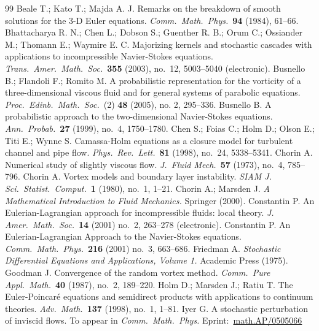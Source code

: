 \documentclass[final]{amsart}%
\numberwithin{equation}{section}
\theoremstyle{definition}
\theoremstyle{remark}
\begin{document}
\begin{thebibliography}{99}%
 Beale T.; Kato T.; Majda A. J. Remarks on the breakdown of smooth solutions for the $3$-D Euler equations. \textit{Comm.\ Math.\ Phys.}\ \textbf{94} (1984), 61--66.
 Bhattacharya R. N.; Chen L.; Dobson S.; Guenther R. B.; Orum C.; Ossiander M.; Thomann E.; Waymire E. C. Majorizing kernels and stochastic cascades with applications to incompressible Navier-Stokes equations. \textit{Trans.\ Amer.\ Math.\ Soc.}\ \textbf{355} (2003), no.\ 12, 5003--5040 (electronic).
 Busnello B.; Flandoli F.; Romito M.  A probabilistic representation for the vorticity of a three-dimensional viscous fluid and for general systems of parabolic equations. \textit{Proc.\ Edinb.\ Math.\ Soc.}\ (2) \textbf{48}  (2005), no. 2, 295--336.
  Busnello B. A probabilistic approach to the two-dimensional Navier-Stokes equations. \textit{Ann.\ Probab.}\ \textbf{27} (1999), no.\ 4, 1750--1780. 
  Chen S.; Foias C.; Holm D.; Olson E.; Titi E.; Wynne S.  Camassa-Holm equations as a closure model for turbulent channel and pipe flow.  \textit{Phys.\ Rev.\ Lett.}\ \textbf{81} (1998), no.\ 24, 5338--5341.
 Chorin A. Numerical study of slightly viscous flow.  \textit{J.\ Fluid Mech.}\ \textbf{57} (1973), no.\ 4, 785--796.
 Chorin A.  Vortex models and boundary layer instability. \textit{SIAM J. Sci.\ Statist.\ Comput.}\ \textbf{1} (1980), no.\ 1, 1--21.
 Chorin A.; Marsden J. \textit{A Mathematical Introduction to Fluid Mechanics.} Springer (2000).
 Constantin P. An Eulerian-Lagrangian approach for incompressible fluids: local theory.  \textit{J. Amer.\ Math.\ Soc.}\ \textbf{14} (2001) no.\ 2, 263--278 (electronic).
 Constantin P. An Eulerian-Lagrangian Approach to the Navier-Stokes equations. \textit{Comm.\ Math.\ Phys.}\ \textbf{216} (2001) no.\ 3, 663--686.
 Friedman A. \textit{Stochastic Differential Equations and Applications, Volume 1.} Academic Press (1975).
 Goodman J. Convergence of the random vortex method.  \textit{Comm.\ Pure Appl.\ Math.}\ \textbf{40} (1987), no.\ 2, 189--220.
 Holm D.; Marsden J.; Ratiu T. The Euler-Poincar\'e equations and semidirect products with applications to continuum theories. \textit{Adv.\ Math.}\ \textbf{137} (1998), no.\ 1, 1--81.
 Iyer G. A stochastic perturbation of inviscid flows. To appear in \textit{Comm.\ Math.\ Phys.} Eprint:~\href{http://arxiv.org/abs/math/0505066}{math.AP/0505066}

\end{thebibliography}
\end{document}
